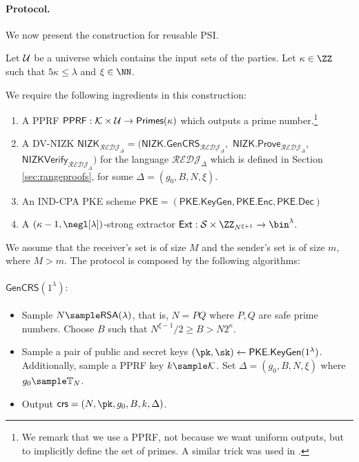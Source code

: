 \paragraph{Protocol.} 
We now present the construction for reusable PSI.
\begin{construction}
\label{const:lpsi}
Let $\mathcal{U}$ be a universe which contains the input sets of the parties. Let $\kappa\in\ZZ$ such that $5\kappa\leq \lambda$ and $\xi\in\NN$.
 
We require the following ingredients in this construction:
\begin{enumerate}
    \item A PPRF $\mathsf{PPRF}:\mathcal{K}\times \mathcal{U}\to \mathsf{Primes}(\kappa)$ which outputs a prime number.\footnote{We remark that we use a PPRF, not because we want uniform outputs, but to implicitly define the set of primes. A similar trick was used in \cite{C:BoyGilIsh16}.}
    \item A DV-NIZK $\mathsf{NIZK}_{\mathcal{REDJ}_{\Delta}}=(\mathsf{NIZK.GenCRS}_{\mathcal{REDJ}_{\Delta}},$ $\mathsf{NIZK.Prove}_{\mathcal{REDJ}_{\Delta}},$ $\mathsf{NIZKVerify}_{\mathcal{REDJ}_{\Delta}})$ for the language $\mathcal{REDJ}_{\Delta}$ which is defined in Section \ref{sec:rangeproofs}, for some $\Delta=(g_0,B,N,\xi)$. 
    \item An IND-CPA PKE scheme $\mathsf{PKE}=(\mathsf{PKE.KeyGen}, \mathsf{PKE.Enc},\mathsf{PKE.Dec})$
    \item A $(\kappa-1,\negl[\lambda])$-strong extractor $\mathsf{Ext}:\Sc\times \ZZ_{N^{\xi+1}}\to\bin^\lambda$. 
\end{enumerate}

We assume that the receiver's set is of size $M$ and the sender's set is of size $m$, where $M>m$. 
The protocol is composed by the following algorithms:
\paragraph{$\mathsf{GenCRS}(1^\lambda):$}
\begin{itemize}
    \item Sample $N\sample \mathsf{RSA}(\lambda)$, that is, $N=PQ$ where $P,Q$ are safe prime numbers.
     Choose $B$ such that $N^{\xi-1}/2 \ge B > N 2^{\kappa}$.

   \item Sample a pair of public and secret keys $(\pk,\sk)\leftarrow\mathsf{PKE.KeyGen}(1^\lambda)$. Additionally, sample a PPRF key $k\sample \Kc$. Set $\Delta=(g_0,B,N,\xi)$ where $g_0\sample \TT_N$.
    \item Output $\crs=(N,\pk,g_0,B,k,\Delta)$.
\end{itemize}

\end{construction}
